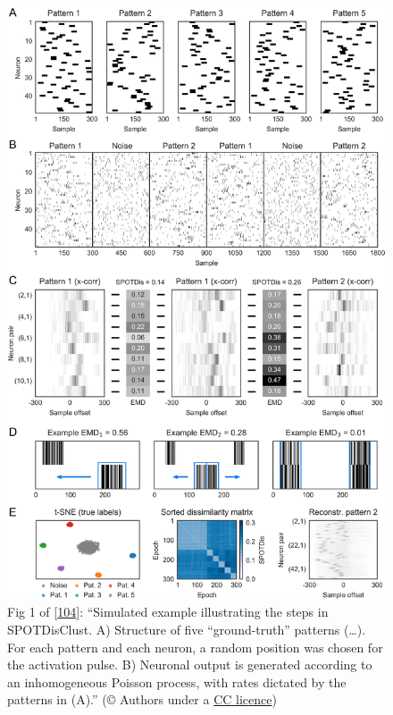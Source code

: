 \begin{figure}
\hypertarget{fig:G2018-1}{%
\centering
\includegraphics[width=7in,height=\textheight]{images/pcbi.1006283.g001.PNG_L.png}
\caption{Fig 1 of {[}\protect\hyperlink{ref-9AK1cwY1}{104}{]}: ``Simulated example illustrating the steps in SPOTDisClust. A) Structure of five ``ground-truth'' patterns (\ldots). For each pattern and each neuron, a random position was chosen for the activation pulse. B) Neuronal output is generated according to an inhomogeneous Poisson process, with rates dictated by the patterns in (A).'' (© Authors under a \href{https://journals.plos.org/ploscompbiol/article?id=10.1371/journal.pcbi.1006283}{CC licence})}\label{fig:G2018-1}
}
\end{figure}

